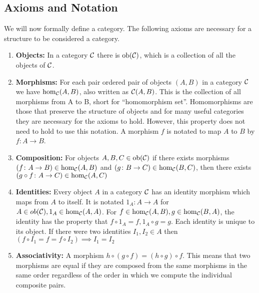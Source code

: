 \subsection{Axioms and Notation}%
\label{sec:cat-axioms}

We will now formally define a category. The following axioms are necessary for a
structure to be considered a category.
\begin{enumerate}
        \item \textbf{Objects:} In a category $\mathcal{C}$ there is
        $\operatorname{ob}(\mathcal{C})$, which is a collection of all the objects of
        $\mathcal{C}$.

        \item \textbf{Morphisms:} For each pair ordered pair of objects $(A,B)$
        in a category $\mathcal{C}$ we have $\hom_\mathcal{C}(A,B)$, also written
        as $\mathcal{C}(A,B)$.  This is the collection of all morphisms from A to
        B, short for ``homomorphism set''. Homomorphisms are those that preserve
        the structure of objects and for many useful categories they are
        necessary for the axioms to hold. However, this property does not need
        to hold to use this notation. A morphism $f$ is notated to map $A$ to
        $B$ by $f\colon A\to B$.

        \item \textbf{Composition:} For objects $A,B,C\in \operatorname{ob}(\mathcal{C})$
        if there exists morphisms $(f\colon A\to B)\in \hom_\mathcal{C}(A,B)$ and
        $(g \colon B\to C)\in \hom_\mathcal{C}(B,C)$, then there exists $(g\circ
        f\colon A\to C)\in \hom_\mathcal{C}(A,C)$

        \item \textbf{Identities:} Every object $A$ in a category $\mathcal{C}$
        has an identity morphism which maps from $A$ to itself.  It is notated
        $1_A\colon A\to A$ for $A\in ob(\mathcal{C}), 1_A\in
        \hom_\mathcal{C}(A,A)$.  For $f\in \hom_\mathcal{C}(A,B), g\in
        \hom_\mathcal{C}(B,A)$, the identity has the property that $f\circ 1_A =
        f, 1_A\circ g = g$. Each identity is unique to its object. If there were
        two identities $I_1,I_2\in A$ then $(f\circ I_1 = f = f\circ I_2)
        \implies I_1=I_2$

        \item \textbf{Associativity:} A morphism $h\circ(g\circ f) = (h\circ
        g)\circ f$. This means that two morphisms are equal if they are composed
        from the same morphisms in the same order regardless of the order in
        which we compute the individual composite pairs.
\end{enumerate}
